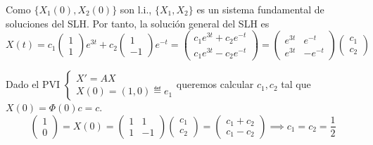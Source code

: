 \begin{ejem}
	Como $\{X_1(0), X_2(0)\}$ son l.i., $\{X_1, X_2\}$ es un sistema fundamental de soluciones del SLH. Por tanto, la solución general del SLH es
	\[X(t) = c_1 \begin{pmatrix}
			1 \\
			1
		\end{pmatrix} e^{3t} + c_2 \begin{pmatrix}
			1 \\
			-1
		\end{pmatrix} e^{-t} = \begin{pmatrix}
			c_1 e^{3t} + c_2 e^{-t} \\
			c_1 e^{3t} - c_2 e^{-t}
		\end{pmatrix} = {\begin{pmatrix}
			e^{3t} & e^{-t}  \\
			e^{3t} & -e^{-t}
		\end{pmatrix}} \begin{pmatrix}
			c_1 \\
			c_2
		\end{pmatrix}\]

	Dado el PVI $\begin{cases}
			X' = AX \\
			X(0) = (1, 0) \eqdef e_1
		\end{cases}$queremos calcular $c_1, c_2$ tal que $X(0) = \Phi(0) c = c$.
	\[\begin{pmatrix}
			1 \\
			0
		\end{pmatrix} = X(0) = \begin{pmatrix}
			1 & 1  \\
			1 & -1
		\end{pmatrix} \begin{pmatrix}
			c_1 \\
			c_2
		\end{pmatrix} = \begin{pmatrix}
			c_1 + c_2 \\
			c_1 - c_2
		\end{pmatrix} \implies c_1 = c_2 = \frac{1}{2}\]
\end{ejem}

